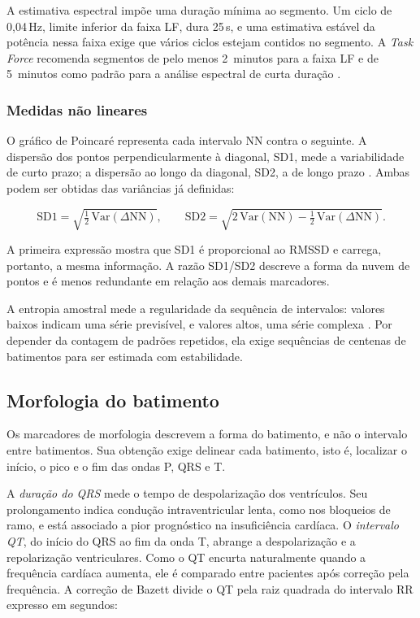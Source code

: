 A estimativa espectral impõe uma duração mínima ao segmento. Um ciclo de
0,04\,Hz, limite inferior da faixa LF, dura 25\,s, e uma estimativa estável
da potência nessa faixa exige que vários ciclos estejam contidos no
segmento. A \textit{Task Force} recomenda segmentos de pelo menos 2~minutos
para a faixa LF e de 5~minutos como padrão para a análise espectral de
curta duração \cite{taskforce1996heart}.

\subsubsection{Medidas não lineares}

O gráfico de Poincaré representa cada intervalo NN contra o seguinte. A
dispersão dos pontos perpendicularmente à diagonal, SD1, mede a
variabilidade de curto prazo; a dispersão ao longo da diagonal, SD2, a de
longo prazo \cite{brennan2001poincare}. Ambas podem ser obtidas das
variâncias já definidas:

\begin{equation}
	\mathrm{SD1} = \sqrt{\tfrac{1}{2}\,\mathrm{Var}(\Delta \mathrm{NN})},
	\qquad
	\mathrm{SD2} = \sqrt{2\,\mathrm{Var}(\mathrm{NN}) -
		\tfrac{1}{2}\,\mathrm{Var}(\Delta \mathrm{NN})}.
	\label{eq:poincare}
\end{equation}

\noindent
A primeira expressão mostra que SD1 é proporcional ao RMSSD e carrega,
portanto, a mesma informação. A razão SD1/SD2 descreve a forma da nuvem de
pontos e é menos redundante em relação aos demais marcadores.

A entropia amostral mede a regularidade da sequência de intervalos: valores
baixos indicam uma série previsível, e valores altos, uma série complexa
\cite{richman2000physiological}. Por depender da contagem de padrões
repetidos, ela exige sequências de centenas de batimentos para ser
estimada com estabilidade.

\subsection{Morfologia do batimento}
\label{subsec:fund-morfologia}

Os marcadores de morfologia descrevem a forma do batimento, e não o
intervalo entre batimentos. Sua obtenção exige delinear cada batimento,
isto é, localizar o início, o pico e o fim das ondas P, QRS e T.

A \textit{duração do QRS} mede o tempo de despolarização dos ventrículos.
Seu prolongamento indica condução intraventricular lenta, como nos bloqueios
de ramo, e está associado a pior prognóstico na insuficiência cardíaca. O
\textit{intervalo QT}, do início do QRS ao fim da onda T, abrange a
despolarização e a repolarização ventriculares. Como o QT encurta
naturalmente quando a frequência cardíaca aumenta, ele é comparado entre
pacientes após correção pela frequência. A correção de Bazett
\cite{bazett1920analysis} divide o QT pela raiz quadrada do intervalo RR
expresso em segundos:

